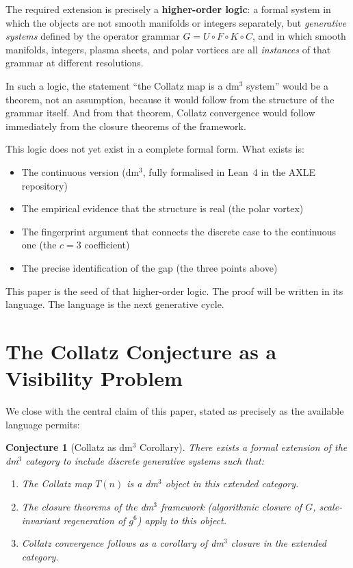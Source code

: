 \documentclass[11pt]{article}
\theoremstyle{plain}
\newtheorem{conjecture}{Conjecture}
\theoremstyle{definition}
\begin{document}
The required extension is precisely a \textbf{higher-order logic}:
a formal system in which the objects are not smooth manifolds or
integers separately, but \textit{generative systems} defined by the
operator grammar $G = U \circ F \circ K \circ C$, and in which smooth
manifolds, integers, plasma sheets, and polar vortices are all
\textit{instances} of that grammar at different resolutions.

In such a logic, the statement ``the Collatz map is a dm$^3$ system''
would be a theorem, not an assumption, because it would follow from
the structure of the grammar itself. And from that theorem, Collatz
convergence would follow immediately from the closure theorems of
the framework.

This logic does not yet exist in a complete formal form. What exists
is:
\begin{itemize}[leftmargin=*]
  \item The continuous version (dm$^3$, fully formalised in Lean~4
    in the AXLE repository)
  \item The empirical evidence that the structure is real
    (the polar vortex)
  \item The fingerprint argument that connects the discrete case to
    the continuous one (the $c = 3$ coefficient)
  \item The precise identification of the gap (the three points above)
\end{itemize}

This paper is the seed of that higher-order logic. The proof will
be written in its language. The language is the next generative cycle.

\section{The Collatz Conjecture as a Visibility Problem}

We close with the central claim of this paper, stated as precisely
as the available language permits:

\begin{conjecture}[Collatz as dm$^3$ Corollary]
There exists a formal extension of the dm$^3$ category to include
discrete generative systems such that:
\begin{enumerate}[label=(\roman*)]
  \item The Collatz map $T(n)$ is a dm$^3$ object in this extended
    category.
  \item The closure theorems of the dm$^3$ framework (algorithmic
    closure of $G$, scale-invariant regeneration of $g^6$) apply to
    this object.
  \item Collatz convergence follows as a corollary of dm$^3$ closure
    in the extended category.
\end{enumerate}
\end{conjecture}
\end{document}
